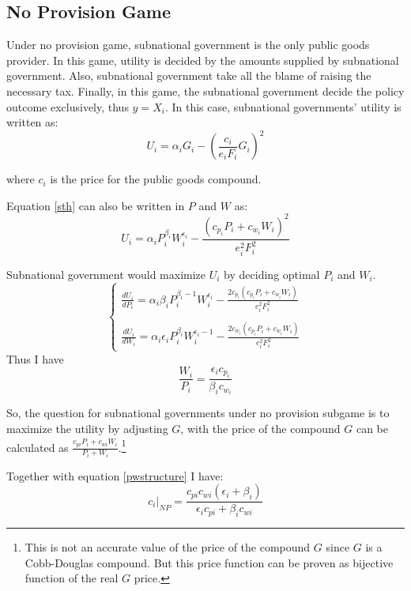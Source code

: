 \begin{itemize}
\subsection{No Provision Game}
Under no provision game, subnational government is the only public goods provider. In this game, utility is decided by the amounts supplied by subnational government. Also, subnational government take all the blame of raising the necessary tax. Finally, in this game, the subnational government decide the policy outcome exclusively, thus $y=X_i$. In this case, subnational governments' utility is written as:
\begin{equation}
  U_i=\alpha_i G_i-\left(\frac{c_i}{e_i F_i} G_i\right)^2 \label{sth}
\end{equation}

where $c_i$ is the price for the public goods compound.

Equation \ref{sth} can also be written in $P$ and $W$ as:
\begin{equation}
  U_i=\alpha_i P_i^{\beta_i}W_i^{\epsilon_i}-\frac{(c_{p_i}P_i+c_{w_i}W_i)^2}{e_i^2 F_i^2}
\end{equation}


Subnational government would maximize $U_i$ by deciding optimal $P_i$ and $W_i$.
$$
  \left\{\begin{array}{l}
    \frac{dU_i}{dP_i}= \alpha_i \beta_i P_i^{\beta_i-1}W_i^{\epsilon_i}-\frac{2 c_{p_i}(c_{p_i}P_i+c_{w_i}W_i)}{e_i^2 F_i^2} \\ \\

    \frac{dU_i}{dW_i}=  \alpha_i \epsilon_i P_i^{\beta_i}W_i^{\epsilon_i-1}-\frac{2 c_{w_i}(c_{p_i}P_i+c_{w_i}W_i)}{e_i^2 F_i^2}\end{array}\right.
$$
Thus I have
\begin{equation}
  \frac{W_i}{P_i}=\frac{\epsilon_i c_{p_i}}{\beta_ic_{w_i}}\label{pwstructure}
\end{equation}

So, the question for subnational governments under no provision subgame is to maximize the utility by adjusting $G$, with the price of the compound $G$ can be calculated as $\frac{c_{pi}P_i+c_{wi}W_i}{P_i+W_i}$.\footnote{This is not an accurate value of the price of the compound $G$ since $G$ is a Cobb-Douglas compound. But this price function can be proven as bijective function of the real $G$ price.}

Together with equation \ref{pwstructure} I have:
\begin{equation}
  c_i|_{NP}=\frac{c_{pi}c_{wi}(\epsilon_i+\beta_i)}{\epsilon_ic_{pi}+\beta_i c_{wi}} \label{priceofpw}
\end{equation}


\end{itemize}
